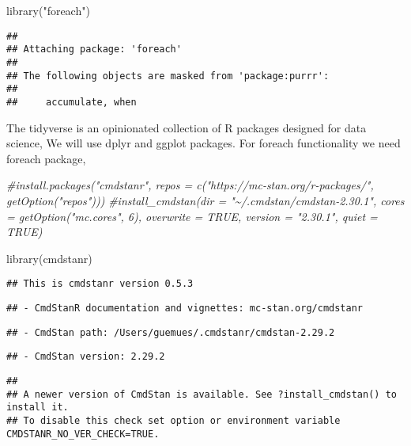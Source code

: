 \documentclass[
]{article}
\newenvironment{Shaded}{\begin{snugshade}}{\end{snugshade}}
\newcommand{\CommentTok}[1]{\textcolor[rgb]{0.56,0.35,0.01}{\textit{#1}}}
\newcommand{\FunctionTok}[1]{\textcolor[rgb]{0.00,0.00,0.00}{#1}}
\newcommand{\NormalTok}[1]{#1}
\newcommand{\StringTok}[1]{\textcolor[rgb]{0.31,0.60,0.02}{#1}}
\begin{document}
\begin{Shaded}
\begin{Highlighting}[]
\FunctionTok{library}\NormalTok{(}\StringTok{"foreach"}\NormalTok{)}
\end{Highlighting}
\end{Shaded}

\begin{verbatim}
## 
## Attaching package: 'foreach'
## 
## The following objects are masked from 'package:purrr':
## 
##     accumulate, when
\end{verbatim}

The tidyverse is an opinionated collection of R packages designed for
data science, We will use dplyr and ggplot packages. For foreach
functionality we need foreach package,

\begin{Shaded}
\begin{Highlighting}[]
\CommentTok{\#install.packages("cmdstanr", repos = c("https://mc{-}stan.org/r{-}packages/", getOption("repos")))}
\CommentTok{\#install\_cmdstan(dir = "\textasciitilde{}/.cmdstan/cmdstan{-}2.30.1", cores = getOption("mc.cores", 6), overwrite = TRUE, version = "2.30.1", quiet = TRUE)}

\FunctionTok{library}\NormalTok{(cmdstanr)}
\end{Highlighting}
\end{Shaded}

\begin{verbatim}
## This is cmdstanr version 0.5.3
\end{verbatim}

\begin{verbatim}
## - CmdStanR documentation and vignettes: mc-stan.org/cmdstanr
\end{verbatim}

\begin{verbatim}
## - CmdStan path: /Users/guemues/.cmdstanr/cmdstan-2.29.2
\end{verbatim}

\begin{verbatim}
## - CmdStan version: 2.29.2
\end{verbatim}

\begin{verbatim}
## 
## A newer version of CmdStan is available. See ?install_cmdstan() to install it.
## To disable this check set option or environment variable CMDSTANR_NO_VER_CHECK=TRUE.
\end{verbatim}
\end{document}
